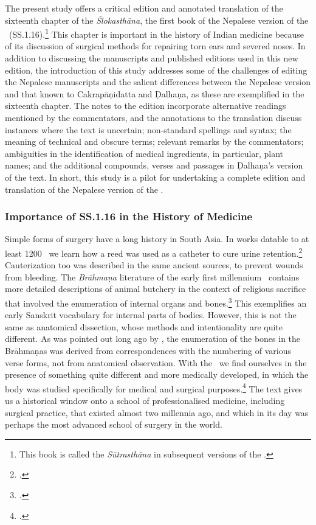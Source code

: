 The present study offers a critical edition and annotated translation of the
sixteenth chapter of the \emph{Ślokasthāna}, the first book of the Nepalese
version of the \SS\ (SS.1.16).\footnote{This book is called the \emph{Sūtrasthāna}
in subsequent versions of the \SS.} This chapter is important in the history of
Indian medicine because of its discussion of surgical methods for repairing torn
ears and severed noses. In addition to discussing the manuscripts and published
editions used in this new edition, the introduction of this study addresses some
of the challenges of editing the Nepalese manuscripts and the salient differences
between the Nepalese version and that known to Cakrapāṇidatta and Ḍalhaṇa, as
these are exemplified in the sixteenth chapter. The notes to the edition
incorporate alternative readings mentioned by the commentators, and the
annotations to the translation discuss instances where the text is uncertain;
non-standard spellings and syntax; the meaning of technical and obscure terms;
relevant remarks by the commentators; ambiguities in the identification of medical
ingredients, in particular, plant names; and the additional compounds, verses and
passages in Ḍalhaṇa's version of the text. In short, this study is a pilot for
undertaking a complete edition and translation of the Nepalese version of the \SS.


\subsubsection{Importance of SS.1.16 in the History of Medicine}


Simple forms of surgery have a long history in South Asia. In works datable to at
least 1200 \BC\ we learn how a reed was used as a catheter to cure urine
retention.\footcite[70--71]{zysk-1985} Cauterization too was described in the same ancient
sources, to prevent wounds from bleeding. The \emph{Brāhmaṇa} literature of the
early first millennium \BC\ contains more detailed descriptions of animal butchery
in the context of religious sacrifice that involved the enumeration of internal
organs and bones.\footcite{mala-1996,saha-2015}   This exemplifies an early
Sanskrit vocabulary for internal parts of bodies.  However, this is not the same
as anatomical dissection, whose methods and intentionality are quite different. As
was pointed out long ago by \citet{keit-1908}, the enumeration of the bones in the
Brāhmaṇas was derived from correspondences with the numbering of various verse
forms, not from anatomical observation.  With the \SS\ we find ourselves in the
presence of something quite different and more medically developed, in which the body was
studied specifically for medical and surgical purposes.\footcite{zysk-1986} The
text gives us a historical window onto a school of professionalised medicine, including surgical
practice, that existed almost two millennia ago, and which in its day was perhaps
the most advanced school of surgery in the world.

